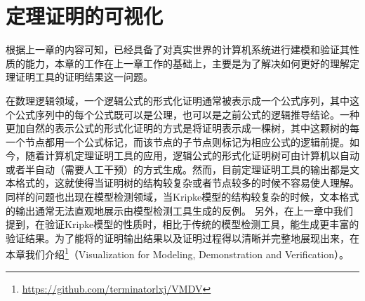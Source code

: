 \chapter{定理证明的可视化}\label{chapt:visulization}
根据上一章的内容可知，\sctlprov{}已经具备了对真实世界的计算机系统进行建模和验证其\CTLP{}性质的能力，本章的工作在上一章工作的基础上，主要是为了解决如何更好的理解定理证明工具\sctlprov{}的证明结果这一问题。

在数理逻辑领域，一个逻辑公式的形式化证明通常被表示成一个公式序列，其中这个公式序列中的每个公式既可以是公理，也可以是之前公式的逻辑推导结论。一种更加自然的表示公式的形式化证明的方式是将证明表示成一棵树，其中这颗树的每一个节点都用一个公式标记，而该节点的子节点则标记为相应公式的逻辑前提。如今，随着计算机定理证明工具的应用，逻辑公式的形式化证明树可由计算机以自动或者半自动（需要人工干预）的方式生成。然而，目前定理证明工具的输出都是文本格式的，这就使得当证明树的结构较复杂或者节点较多的时候不容易使人理解。同样的问题也出现在模型检测领域，当Kripke模型的结构较复杂的时候，文本格式的输出通常无法直观地展示由模型检测工具生成的反例。
另外，在上一章中我们提到，\sctlprov{}在验证Kripke模型的性质时，相比于传统的模型检测工具，能生成更丰富的验证结果。为了能将\sctlprov{}的证明输出结果以及证明过程得以清晰并完整地展现出来，在本章我们介绍\footnote{\url{https://github.com/terminatorlxj/VMDV}}（Visualization for Modeling, Demonstration and Verification）。

